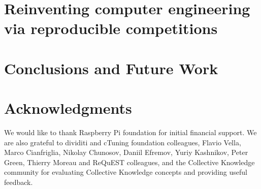 \documentclass[10pt,letterpaper,twocolumn]{article}
\begin{document}
\section{Reinventing computer engineering via reproducible competitions}
\label{sec:competitions}


\section{Conclusions and Future Work}
\label{sec:conclusions}


\section{Acknowledgments}
\label{sec:ack}

We would like to thank Raspberry Pi foundation for initial financial support.
We are also grateful to dividiti and cTuning foundation colleagues, 
Flavio Vella, Marco Cianfriglia, Nikolay Chunosov, Daniil Efremov, Yuriy Kashnikov, 
Peter Green, Thierry Moreau and ReQuEST colleagues, and the Collective Knowledge community 
for evaluating Collective Knowledge concepts and providing useful feedback.



\newpage




\appendix

\clearpage
\newpage
\pagebreak


\end{document}
